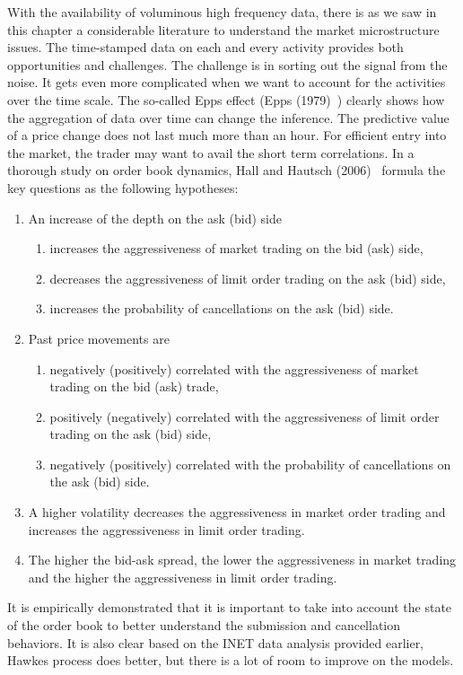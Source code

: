 With the availability of voluminous high frequency data, there is as we saw in this chapter a considerable literature to understand the market microstructure issues. The time-stamped data on each and every activity provides both opportunities and challenges. The challenge is in sorting out the signal from the noise. It gets even more complicated when we want to account for the activities over the time scale. The so-called Epps effect (Epps (1979)~\cite{epps79}) clearly shows how the aggregation of data over time can change the inference. The predictive value of a price change does not last much more than an hour. For efficient entry into the market, the trader may want to avail the short term correlations. In a thorough study on order book dynamics, Hall and Hautsch (2006)~\cite{hallhautsch06} formula the key questions as the following hypotheses:
	\begin{enumerate}[(1)]
	\item An increase of the depth on the ask (bid) side
		\begin{enumerate}[--]
		\item increases the aggressiveness of market trading on the bid (ask) side,
		\item decreases the aggressiveness of limit order trading on the ask (bid) side,
		\item increases the probability of cancellations on the ask (bid) side.
		\end{enumerate}
	\item Past price movements are
		\begin{enumerate}[--]
		\item negatively (positively) correlated with the aggressiveness of market trading on the bid (ask) trade,
		\item positively (negatively) correlated with the aggressiveness of limit order trading on the ask (bid) side,
		\item negatively (positively) correlated with the probability of cancellations on the ask (bid) side.
		\end{enumerate}
	\item A higher volatility decreases the aggressiveness in market order trading and increases the aggressiveness in limit order trading.
	\item The higher the bid-ask spread, the lower the aggressiveness in market trading and the higher the aggressiveness in limit order trading. 
	\end{enumerate}
It is empirically demonstrated that it is important to take into account the state of the order book to better understand the submission and cancellation behaviors. It is also clear based on the INET data analysis provided earlier, Hawkes process does better, but there is a lot of room to improve on the models.